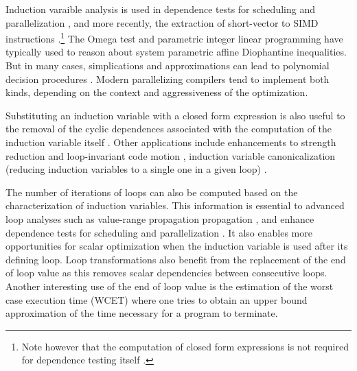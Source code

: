 {Induction varaible analysis is used in dependence tests for scheduling
and parallelization \cite{Wol96}, and more recently, the extraction of
short-vector to SIMD instructions \cite{Nuz06}.\footnote{Note however
  that the computation of closed form expressions is not required for
  dependence testing itself \cite{Wu01}.} The Omega test \cite{Pug91}
and parametric integer linear programming \cite{Fea88b} have typically
used to reason about system parametric affine Diophantine
inequalities. But in many cases, simplications and approximations can
lead to polynomial decision procedures \cite{Ban88}. Modern
parallelizing compilers tend to implement both kinds, depending on the
context and aggressiveness of the optimization.

Substituting an induction variable with a closed form expression is
also useful to the removal of the cyclic dependences associated with
the computation of the induction variable itself \cite{Ger95}. Other
applications include enhancements to strength reduction and
loop-invariant code motion \cite{Ger95}, induction variable
canonicalization (reducing induction variables to a single one in a
given loop) \cite{Liu96}.

The number of iterations of loops can also be computed based on the
characterization of induction variables.  This information is
essential to advanced loop analyses such as value-range propagation
propagation \cite{VRP}, and enhance dependence tests for scheduling
and parallelization \cite{Ban88,Pug91}.  It also enables more
opportunities for scalar optimization when the induction variable is
used after its defining loop.  Loop transformations also benefit from
the replacement of the end of loop value as this removes scalar
dependencies between consecutive loops.  Another interesting use of
the end of loop value is the estimation of the worst case execution
time (WCET) where one tries to obtain an upper bound approximation of
the time necessary for a program to terminate.



}
